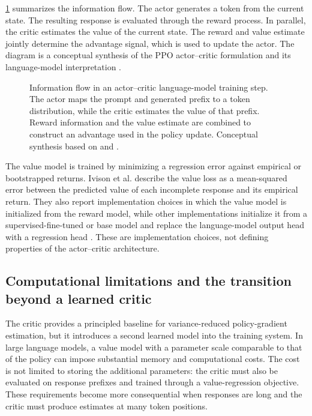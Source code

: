 \cref{fig:ac-architecture} summarizes the information flow. The actor
generates a token from the current state. The resulting response is
evaluated through the reward process. In parallel, the critic estimates
the value of the current state. The reward and value estimate jointly
determine the advantage signal, which is used to update the actor. The
diagram is a conceptual synthesis of the PPO actor--critic formulation
and its language-model interpretation
\parencite{schulman2017ppo,ivison2024unpacking}.

\begin{figure}[htbp]
    \centering
    \resizebox{0.95\textwidth}{!}{}
    \caption{Information flow in an actor--critic language-model training
    step. The actor maps the prompt and generated prefix to a token
    distribution, while the critic estimates the value of that prefix.
    Reward information and the value estimate are combined to construct
    an advantage used in the policy update. Conceptual synthesis based on
    \textcite{schulman2017ppo} and \textcite{ivison2024unpacking}.}
    \label{fig:ac-architecture}
\end{figure}

The value model is trained by minimizing a regression error against
empirical or bootstrapped returns. Ivison et al. describe the value loss
as a mean-squared error between the predicted value of each incomplete
response and its empirical return. They also report implementation
choices in which the value model is initialized from the reward model,
while other implementations initialize it from a supervised-fine-tuned
or base model and replace the language-model output head with a regression
head \parencite{ivison2024unpacking}. These are implementation choices,
not defining properties of the actor--critic architecture.

\subsection{Computational limitations and the transition beyond a learned critic}
\label{subsec:ac-limitations-transition}

The critic provides a principled baseline for variance-reduced
policy-gradient estimation, but it introduces a second learned model into
the training system. In large language models, a value model with a
parameter scale comparable to that of the policy can impose substantial
memory and computational costs. The cost is not limited to storing the
additional parameters: the critic must also be evaluated on response
prefixes and trained through a value-regression objective. These
requirements become more consequential when responses are long and the
critic must produce estimates at many token positions.

